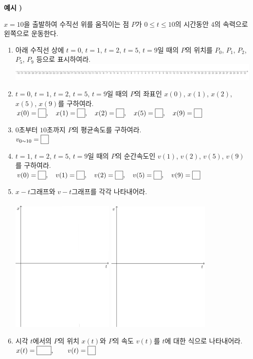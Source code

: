 \documentclass{oblivoir}
\newcounter{num}
\newcommand\exam[1]
{\bigskip\par\noindent\stepcounter{num} \textbf{예시 \thenum) #1}\par\noindent}
\newcommand\pb[1]{\ensuremath{\fbox{\phantom{#1}}}}
\begin{document}
%
\exam{}
\(x=10\)을 출발하여 수직선 위를 움직이는 점 \(P\)가 \(0\le t\le 10\)의 시간동안 \(4\)의 속력으로 왼쪽으로 운동한다.
\begin{enumerate}[label=(\(\arabic*\))]
\item
아래 수직선 상에 \(t=0\), \(t=1\), \(t=2\), \(t=5\), \(t=9\)일 때의 \(P\)의 위치를 \(P_0\), \(P_1\), \(P_2\), \(P_5\), \(P_9\) 등으로 표시하여라.\\
\includegraphics[width=1.3\textwidth]{line2}
\item
\(t=0\), \(t=1\), \(t=2\), \(t=5\), \(t=9\)일 때의 \(P\)의 좌표인 \(x(0)\), \(x(1)\), \(x(2)\), \(x(5)\), \(x(9)\)를 구하여라.\\
\(x(0)=\pb{1},\quad x(1)=\pb{1},\quad x(2)=\pb{1},\quad x(5)=\pb{1},\quad x(9)=\pb{1}\)
\item
\(0\)초부터 \(10\)초까지 \(P\)의 평균속도를 구하여라.\\
\(v_{0\sim10}=\pb{1}\)
\item
\(t=1\), \(t=2\), \(t=5\), \(t=9\)일 때의 \(P\)의 순간속도인 \(v(1)\), \(v(2)\), \(v(5)\), \(v(9)\)를 구하여라.\\
\(v(0)=\pb{1},\quad v(1)=\pb{1},\quad v(2)=\pb{1},\quad v(5)=\pb{1},\quad v(9)=\pb{1}\)
\item
\(x-t\)그래프와 \(v-t\)그래프를 각각 나타내어라.\\\\
\includegraphics[width=0.4\textwidth]{xt}\qquad\qquad
\includegraphics[width=0.4\textwidth]{vt}
\item
시각 \(t\)에서의 \(P\)의 위치 \(x(t)\)와 \(P\)의 속도 \(v(t)\)를 \(t\)에 대한 식으로 나타내어라.\\
\(x(t)=\pb{111},\qquad v(t)=\pb{1}\)
\end{enumerate}
\end{document}
